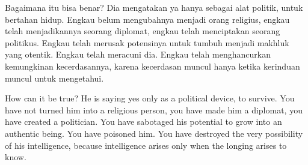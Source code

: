 \bahasa
Bagaimana itu bisa benar? Dia mengatakan ya hanya sebagai alat politik, untuk bertahan hidup. Engkau belum mengubahnya menjadi orang religius, engkau telah menjadikannya seorang diplomat, engkau telah menciptakan seorang politikus. Engkau telah merusak potensinya untuk tumbuh menjadi makhluk yang otentik. Engkau telah meracuni dia. Engkau telah menghancurkan kemungkinan kecerdasannya, karena kecerdasan muncul hanya ketika kerinduan muncul untuk mengetahui.

\english
How can it be true? He is saying yes only as a political device, to survive. You have not turned him into a religious person, you have made him a diplomat, you have created a politician. You have sabotaged his potential to grow into an authentic being. You have poisoned him. You have destroyed the very possibility of his intelligence, because intelligence arises only when the longing arises to know.

\bahasa






